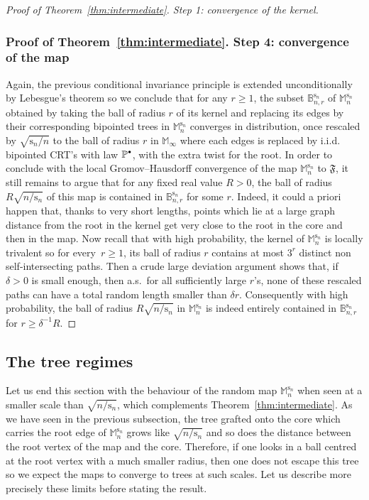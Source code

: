 \documentclass[JEP,XML,SOM,Unicode,NoFloatCountersInSection,NoEqCountersInSection]{cedram}
\newcommand{\sbullet}{{\raisebox{1pt}{$\scriptscriptstyle\bullet $}}}
\theoremstyle{plain}
\theoremstyle{definition}
\theoremstyle{remark}
\renewcommand{\P}{\mathbb{P}}
\newcommand{\Mapb}{\mathbb{M}}
\newcommand{\spar}{\mathrm{s}}
\begin{document}
\begin{proof}[Proof of Theorem~\ref{thm:intermediate}. Step 1: convergence of the kernel]
\subsubsection*{Proof of Theorem~\ref{thm:intermediate}. Step 4: convergence of the map}\enlargethispage{.5\baselineskip}%
Again, the previous conditional invariance principle is extended unconditionally by Lebesgue's theorem so we conclude that for any $r\ge 1$, the subset $\mathbb{B}_{n,r}^{\spar_n}$ of $\Mapb_n^{\spar_n}$ obtained by taking the ball of radius $r$ of its kernel and replacing its edges by their corresponding bipointed trees in $\Mapb_n^{\spar_n}$ converges in distribution, once rescaled by $\sqrt{\spar_n/n}$ to the ball of radius $r$ in $\Mapb_\infty$ where each edges is replaced by i.i.d. bipointed CRT's with law $\P^{\sbullet}$, with the extra twist for the root.
In order to conclude with the local Gromov--Hausdorff convergence of the map $\Mapb_n^{\spar_n}$ to $\mathfrak{F}$, it still remains to argue that for any fixed real value $R>0$, the ball of radius $R \sqrt{n/\spar_n}$ of this map is contained in $\mathbb{B}_{n,r}^{\spar_n}$ for some $r$. Indeed, it could a priori happen that, thanks to very short lengths, points which lie at a large graph distance from the root in the kernel get very close to the root in the core and then in the map.
Now recall that with high probability, the kernel of $\Mapb_n^{\spar_n}$ is locally trivalent so for every~$r \ge 1$, its ball of radius $r$ contains at most $3^{r}$ distinct non self-intersecting paths. Then a crude large deviation argument shows that, if $\delta>0$ is small enough, then a.s.~for all sufficiently large $r$'s, none of these rescaled paths can have a total random length smaller than $\delta r$. Consequently with high probability, the ball of radius $R \sqrt{n/\spar_n}$ in $\Mapb_n^{\spar_n}$ is indeed entirely contained in $\mathbb{B}_{n,r}^{\spar_n}$ for $r \ge \delta^{-1} R$.
\end{proof}

\subsection{The tree regimes}
\label{ssec:limites_abres}

Let us end this section with the behaviour of the random map $\Mapb_n^{\spar_n}$ when seen at a smaller scale than $\sqrt{n/\spar_n}$, which complements Theorem~\ref{thm:intermediate}. As we have seen in the previous subsection, the tree grafted onto the core which carries the root edge of $\Mapb_n^{\spar_n}$ grows like $\sqrt{n/\spar_n}$ and so does the distance between the root vertex of the map and the core. Therefore, if one looks in a ball centred at the root vertex with a much smaller radius, then one does not escape this tree so we expect the maps to converge to trees at such scales. Let us describe more precisely these limits before stating the result.
\end{document}
